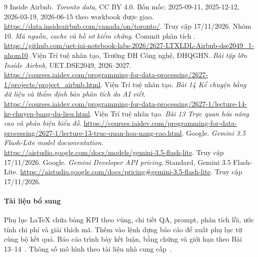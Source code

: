 \documentclass[11pt,a4paper]{article}
\begin{document}
\clearpage
\begin{thebibliography}{9}\small\sloppy
\setlength{\itemsep}{5pt}
 Inside Airbnb. \textit{Toronto data}, CC BY 4.0. Bốn mốc: 2025-09-11, 2025-12-12, 2026-03-19, 2026-06-15 theo workbook được giao. \url{https://data.insideairbnb.com/canada/on/toronto/}. Truy cập 17/11/2026.
 Nhóm 10. \textit{Mã nguồn, cache và hồ sơ kiểm chứng}. Commit phân tích \code{\SourceCommitFull}. \url{https://github.com/uet-iai-notebook-labs-2026/2627-LTXLDL-Airbnb-dse2049_1-nhom10}.
 Viện Trí tuệ nhân tạo, Trường ĐH Công nghệ, ĐHQGHN. \textit{Bài tập lớn Inside Airbnb}, UET.DSE2049, 2026--2027. \url{https://courses.iaidev.com/programming-for-data-processing/2627-1/projects/project_airbnb.html}.
 Viện Trí tuệ nhân tạo. \textit{Bài 14 Kể chuyện bằng dữ liệu và thẩm định bản phân tích do AI viết}. \url{https://courses.iaidev.com/programming-for-data-processing/2627-1/lecture-14-ke-chuyen-bang-du-lieu.html}.
 Viện Trí tuệ nhân tạo. \textit{Bài 13 Trực quan hóa nâng cao và phản biện biểu đồ}. \url{https://courses.iaidev.com/programming-for-data-processing/2627-1/lecture-13-truc-quan-hoa-nang-cao.html}.
 Google. \textit{Gemini 3.5 Flash-Lite model documentation}. \url{https://aistudio.google.com/docs/models/gemini-3.5-flash-lite}. Truy cập 17/11/2026.
 Google. \textit{Gemini Developer API pricing}, Standard, Gemini 3.5 Flash-Lite. \url{https://aistudio.google.com/docs/pricing#gemini-3.5-flash-lite}. Truy cập 17/11/2026.
\end{thebibliography}

\paragraph{Tài liệu bổ sung} Phụ lục LaTeX chứa bảng KPI theo vùng, chi tiết QA, prompt, phân tích lỗi, ước tính chi phí và giải thích mã. Thêm  vào lệnh dựng báo cáo để xuất phụ lục từ cùng bộ kết quả. Báo cáo trình bày kết luận, bằng chứng và giới hạn theo Bài 13--14~\cite{story,viz}. Thông số mô hình theo tài liệu nhà cung cấp~\cite{model}.
\end{document}
